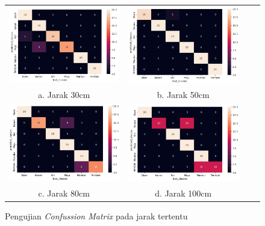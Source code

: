 \begin{enumerate}
  \begin{figure}[H]
      \begin{tabular}{cccc}
        \includegraphics[width=0.4\linewidth]{gambar/cm30.png} & \includegraphics[width=0.4\linewidth]{gambar/cm50.png} \\
        a. Jarak 30cm & b. Jarak 50cm \\ 
        \includegraphics[width=0.4\linewidth]{gambar/cm80.png} & \includegraphics[width=0.4\linewidth]{gambar/cm100.png} \\
        c. Jarak 80cm & d. Jarak 100cm
      \end{tabular}
      \centering
      \caption{Pengujian \emph{Confussion Matrix} pada jarak tertentu}
      \label{fig:confusionmatrixjarak}
  \end{figure}
  

\end{enumerate}